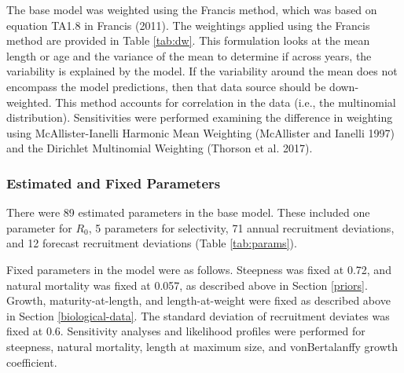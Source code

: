 \documentclass[11pt,
  english,
  a4paper,
]{article}
\begin{document}
\leavevmode\tagmcend\tagstructend\par


The base model was weighted using the Francis method, which was based on equation TA1.8 in Francis {(2011)\leavevmode\tagmcend\tagstructend}. The weightings applied using the Francis method are provided in Table \ref{tab:dw}. This formulation looks at the mean length or age and the variance of the mean to determine if across years, the variability is explained by the model. If the variability around the mean does not encompass the model predictions, then that data source should be down-weighted. This method accounts for correlation in the data (i.e., the multinomial distribution). Sensitivities were performed examining the difference in weighting using McAllister-Ianelli Harmonic Mean Weighting {(McAllister and Ianelli 1997)\leavevmode\tagmcend\tagstructend} and the Dirichlet Multinomial Weighting {(Thorson et al. 2017)\leavevmode\tagmcend\tagstructend}.

\leavevmode\tagmcend\tagstructend\par


\hypertarget{estimated-and-fixed-parameters}{%
\subsubsection{Estimated and Fixed Parameters}\label{estimated-and-fixed-parameters}}

\leavevmode\tagmcend\tagstructend


There were 89 estimated parameters in the base model. These included one parameter for {\(R_0\)\leavevmode\tagmcend\tagstructend}, 5 parameters for selectivity, 71 annual recruitment deviations, and 12 forecast recruitment deviations (Table \ref{tab:params}).

\leavevmode\tagmcend\tagstructend\par


Fixed parameters in the model were as follows. Steepness was fixed at 0.72, and natural mortality was fixed at 0.057, as described above in Section \ref{priors}. Growth, maturity-at-length, and length-at-weight were fixed as described above in Section \ref{biological-data}. The standard deviation of recruitment deviates was fixed at 0.6. Sensitivity analyses and likelihood profiles were performed for steepness, natural mortality, length at maximum size, and vonBertalanffy growth coefficient.
\end{document}
